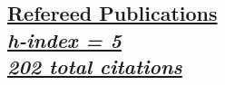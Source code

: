 \documentclass[margin]{res}
\begin{document}
\begin{resume}








\section{
\href{https://ui.adsabs.harvard.edu/search/filter_property_fq_property=AND&filter_property_fq_property=property\%3A\%22refereed\%22&fq=\%7B!type\%3Daqp\%20v\%3D\%24fq_property\%7D&fq_property=(property\%3A\%22refereed\%22)&p_=0&q=orcid\%3A0000-0002-1873-8973&sort=citation_count\%20desc\%2C\%20bibcode\%20desc}
{Refereed Publications\\  
\normalfont \textit{\small{h-index = 5\\
202 total citations
}}}
}


\end{resume}
\end{document}
